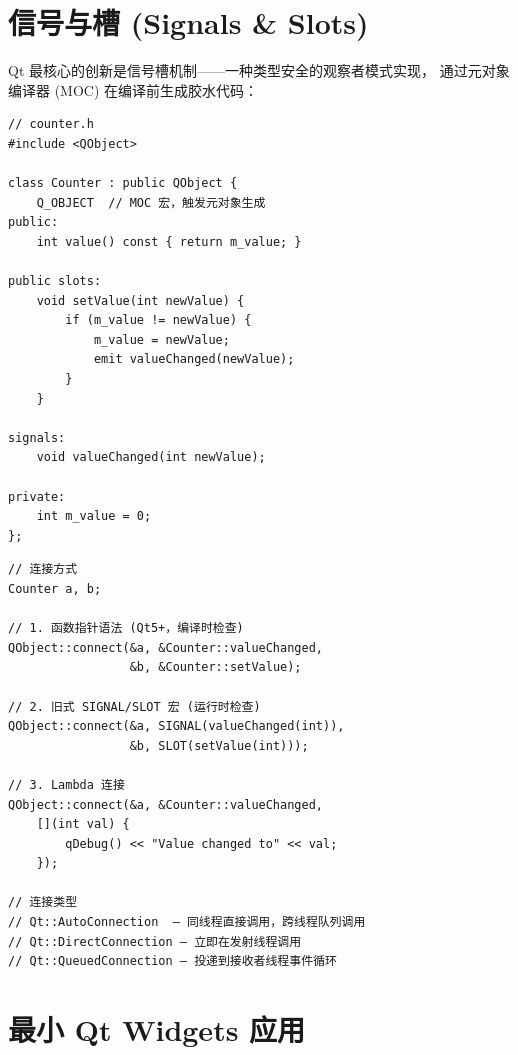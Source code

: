 \documentclass[12pt,a4paper,fontset=fandol]{ctexbook}
\newcommand{\cpplabel}{%
  \tcbox[on line,colback=cppheadbg,colframe=cppheadbg,
    boxrule=0pt,arc=1pt,left=2pt,right=2pt,top=1pt,bottom=1pt,
    colupper=white,fontupper=\scriptsize\bfseries]{C++}}
\begin{document}
\section{信号与槽 (Signals \& Slots)}

Qt 最核心的创新是信号槽机制——一种类型安全的观察者模式实现，
通过元对象编译器 (MOC) 在编译前生成胶水代码：

\cpplabel
\begin{lstlisting}[style=cppstyle]
// counter.h
#include <QObject>

class Counter : public QObject {
    Q_OBJECT  // MOC 宏，触发元对象生成
public:
    int value() const { return m_value; }

public slots:
    void setValue(int newValue) {
        if (m_value != newValue) {
            m_value = newValue;
            emit valueChanged(newValue);
        }
    }

signals:
    void valueChanged(int newValue);

private:
    int m_value = 0;
};
\end{lstlisting}

\cpplabel
\begin{lstlisting}[style=cppstyle]
// 连接方式
Counter a, b;

// 1. 函数指针语法 (Qt5+，编译时检查)
QObject::connect(&a, &Counter::valueChanged,
                 &b, &Counter::setValue);

// 2. 旧式 SIGNAL/SLOT 宏 (运行时检查)
QObject::connect(&a, SIGNAL(valueChanged(int)),
                 &b, SLOT(setValue(int)));

// 3. Lambda 连接
QObject::connect(&a, &Counter::valueChanged,
    [](int val) {
        qDebug() << "Value changed to" << val;
    });

// 连接类型
// Qt::AutoConnection  — 同线程直接调用，跨线程队列调用
// Qt::DirectConnection — 立即在发射线程调用
// Qt::QueuedConnection — 投递到接收者线程事件循环
\end{lstlisting}

\section{最小 Qt Widgets 应用}
\end{document}
